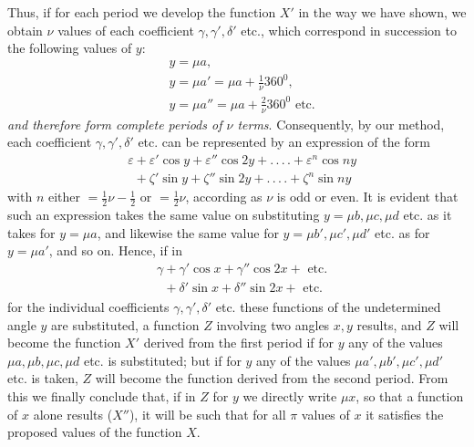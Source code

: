 Thus, if for each period we develop the function
$X'$ in the way we have shown, we obtain $\nu$ values of each coefficient $\gamma,\gamma',\delta'$ etc., which correspond in succession to the following values of $y$:
\[
\begin{aligned}
&y=\mu a,\\[5pt]
& y=\mu a'=\mu a+\tfrac1\nu360^0,\\[5pt]
& y=\mu a''=\mu a+\tfrac2\nu360^0\text{ etc.}
\end{aligned}
\]
\textit{and therefore form complete periods of $\nu$ terms}. 
Consequently, by our method, each coefficient $\gamma,\gamma',\delta'$ etc. can be represented by an expression of the form
\[
\begin{aligned}
&\varepsilon+\varepsilon'\cos y+\varepsilon''\cos2y+.\,.\,.\,.+\varepsilon^n\cos ny\\[5pt]
&\phantom{\varepsilon}+\zeta'\sin y+\zeta''\sin2y+.\,.\,.\,.+\zeta^n\sin ny
\end{aligned}
\]
with $n$ either $=\tfrac12\nu-\tfrac12$ or $=\tfrac12\nu$, according as $\nu$ is odd or even. It is evident that such an expression takes the same value on substituting $y=\mu b,\mu c,\mu d$ etc. as it takes for $y=\mu a$, and likewise the same value for $y=\mu b',\mu c',\mu d'$ etc. as for $y=\mu a'$, and so on. Hence, if in
\[
\begin{aligned}
&\gamma+\gamma'\cos x+\gamma''\cos2x+\text{ etc.}\\[5pt]
&\phantom{\gamma}+\delta'\sin x+\delta''\sin2x+\text{ etc.}
\end{aligned}
\]
for the individual coefficients $\gamma,\gamma',\delta'$ etc. these functions of the undetermined angle $y$ are substituted, a function $Z$ involving two angles $x,y$ results, and $Z$ will become the function $X'$ derived from the first period if for $y$ any of the values $\mu a,\mu b,\mu c,\mu d$ etc. is substituted; but if for $y$ any of the values $\mu a',\mu b',\mu c',\mu d'$ etc. is taken, $Z$ will become the function derived from the second period. From this we finally conclude that, if in $Z$ for $y$ we directly write $\mu x$, so that a function of $x$ alone results ($X''$), it will be such that for all $\pi$ values of $x$ it satisfies the proposed values of the function $X$.

\endgroup
